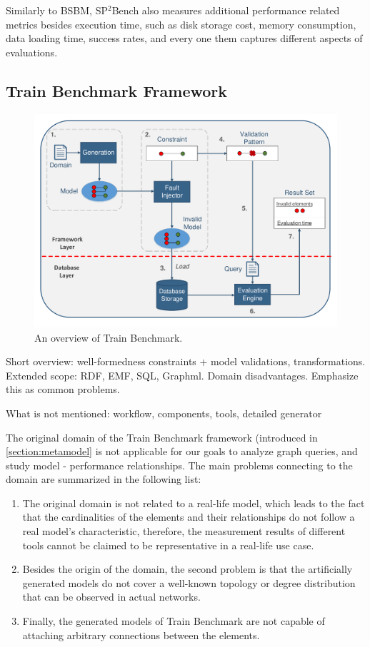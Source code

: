 Similarly to BSBM, SP$^2$Bench also measures additional performance related metrics besides execution time, such as disk storage cost, memory consumption, data loading time, success rates, and every one them captures different aspects of evaluations.


\subsection{Train Benchmark Framework}

\begin{figure}[!ht]
	\centering
	\includegraphics[width=150mm, keepaspectratio]{figures/functionality.pdf}
	\caption{An overview of Train Benchmark.}
	\label{fig:functionality}
\end{figure}

Short overview: well-formedness constraints + model validations, transformations.\\
Extended scope: RDF, EMF, SQL, Graphml.
Domain disadvantages. Emphasize this as common problems.

What is not mentioned: workflow, components, tools, detailed generator


The original domain of the Train Benchmark framework (introduced in \ref{section:metamodel} is not applicable for our goals to analyze graph queries, and study model - performance relationships. The main problems connecting to the domain are summarized in the following list:
\begin{enumerate}
	\item The original domain is not related to a real-life model, which leads to the fact that the cardinalities of the elements and their relationships do not follow a real model's characteristic, therefore, the measurement results of different tools cannot be claimed to be representative in a real-life use case. \label{item:railway_problem1}
	\item Besides the origin of the domain, the second problem is that the artificially generated models do not cover a well-known topology or degree distribution that can be observed in actual networks. \label{item:railway_problem2}
	\item Finally, the generated models of Train Benchmark are not capable of attaching arbitrary connections between the elements. \label{item:railway_problem3}
\end{enumerate}

